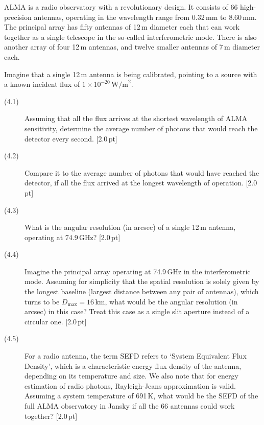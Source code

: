 ALMA is a radio observatory with a revolutionary design. It consists of 66
high-precision antennas, operating in the wavelength range from 0.32\,mm to
8.60\,mm. The principal array has fifty antennas of 12\,m diameter each that
can work together as a single telescope in the so-called interferometric
mode. There is also another array of four 12\,m antennas, and twelve smaller
antennas of 7\,m diameter each.

Imagine that a single 12\,m antenna is being calibrated, pointing to a source
with a known incident flux of $1 \times 10^{-20}\,\mathrm{W/m}^2$.

\begin{description}
\item[(4.1)] Assuming that all the flux arrives at the shortest wavelength of
  ALMA sensitivity, determine the average number of photons that would reach
  the detector every second. \hfill[2.0\,pt]
\item[(4.2)] Compare it to the average number of photons that would have
  reached the detector, if all the flux arrived at the longest wavelength of
  operation. \hfill[2.0\,pt]
\item[(4.3)] What is the angular resolution (in arcsec) of a single 12\,m
  antenna, operating at 74.9\,GHz? \hfill[2.0\,pt]
\item[(4.4)] Imagine the principal array operating at 74.9\,GHz in the
  interferometric mode. Assuming for simplicity that the spatial resolution
  is solely given by the longest baseline (largest distance between any pair
  of antennas), which turns to be $D_{\max} = 16$\,km, what would be the
  angular resolution (in arcsec) in this case? Treat this case as a single
  slit aperture instead of a circular one. \hfill[2.0\,pt]
\item[(4.5)] For a radio antenna, the term SEFD refers to `System Equivalent
  Flux Density', which is a characteristic energy flux density of the
  antenna, depending on its temperature and size. We also note that for
  energy estimation of radio photons, Rayleigh-Jeans approximation is valid.
  Assuming a system temperature of 691\,K, what would be the SEFD of the full
  ALMA observatory in Jansky if all the 66 antennas could work together?
  \hfill[2.0\,pt]
\end{description}
